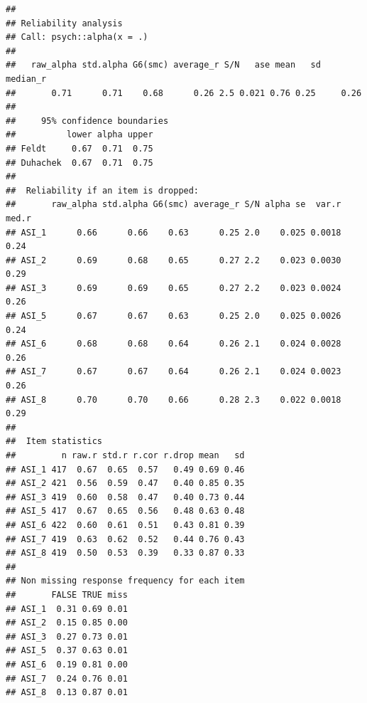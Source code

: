\documentclass[
]{article}
\newenvironment{Shaded}{\begin{snugshade}}{\end{snugshade}}
\newcommand{\AttributeTok}[1]{\textcolor[rgb]{0.13,0.29,0.53}{#1}}
\newcommand{\FunctionTok}[1]{\textcolor[rgb]{0.13,0.29,0.53}{\textbf{#1}}}
\newcommand{\NormalTok}[1]{#1}
\newcommand{\OtherTok}[1]{\textcolor[rgb]{0.56,0.35,0.01}{#1}}
\newcommand{\SpecialCharTok}[1]{\textcolor[rgb]{0.81,0.36,0.00}{\textbf{#1}}}
\newcommand{\StringTok}[1]{\textcolor[rgb]{0.31,0.60,0.02}{#1}}
\begin{document}
\begin{verbatim}
## 
## Reliability analysis   
## Call: psych::alpha(x = .)
## 
##   raw_alpha std.alpha G6(smc) average_r S/N   ase mean   sd median_r
##       0.71      0.71    0.68      0.26 2.5 0.021 0.76 0.25     0.26
## 
##     95% confidence boundaries 
##          lower alpha upper
## Feldt     0.67  0.71  0.75
## Duhachek  0.67  0.71  0.75
## 
##  Reliability if an item is dropped:
##       raw_alpha std.alpha G6(smc) average_r S/N alpha se  var.r med.r
## ASI_1      0.66      0.66    0.63      0.25 2.0    0.025 0.0018  0.24
## ASI_2      0.69      0.68    0.65      0.27 2.2    0.023 0.0030  0.29
## ASI_3      0.69      0.69    0.65      0.27 2.2    0.023 0.0024  0.26
## ASI_5      0.67      0.67    0.63      0.25 2.0    0.025 0.0026  0.24
## ASI_6      0.68      0.68    0.64      0.26 2.1    0.024 0.0028  0.26
## ASI_7      0.67      0.67    0.64      0.26 2.1    0.024 0.0023  0.26
## ASI_8      0.70      0.70    0.66      0.28 2.3    0.022 0.0018  0.29
## 
##  Item statistics 
##         n raw.r std.r r.cor r.drop mean   sd
## ASI_1 417  0.67  0.65  0.57   0.49 0.69 0.46
## ASI_2 421  0.56  0.59  0.47   0.40 0.85 0.35
## ASI_3 419  0.60  0.58  0.47   0.40 0.73 0.44
## ASI_5 417  0.67  0.65  0.56   0.48 0.63 0.48
## ASI_6 422  0.60  0.61  0.51   0.43 0.81 0.39
## ASI_7 419  0.63  0.62  0.52   0.44 0.76 0.43
## ASI_8 419  0.50  0.53  0.39   0.33 0.87 0.33
## 
## Non missing response frequency for each item
##       FALSE TRUE miss
## ASI_1  0.31 0.69 0.01
## ASI_2  0.15 0.85 0.00
## ASI_3  0.27 0.73 0.01
## ASI_5  0.37 0.63 0.01
## ASI_6  0.19 0.81 0.00
## ASI_7  0.24 0.76 0.01
## ASI_8  0.13 0.87 0.01
\end{verbatim}

\begin{Shaded}
\end{Shaded}
\end{document}
